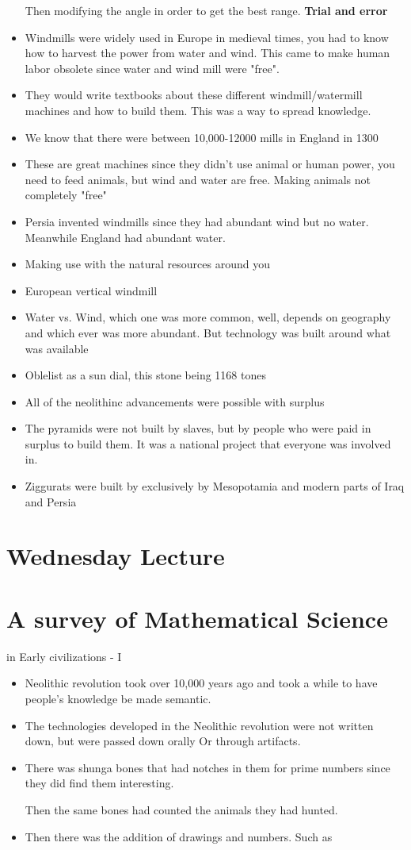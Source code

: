 \documentclass{article}
\begin{document}
\begin{itemize}
  Then modifying the angle in order to get the best range. \textbf{Trial and error}
\item Windmills were widely used in Europe in medieval times,
  you had to know how to harvest the power from water and wind. This came to
  make human labor obsolete since water and wind mill were "free".
\item They would write textbooks about these different windmill/watermill machines
  and how to build them. This was a way to spread knowledge.
\item We know that there were between 10,000-12000 mills in England in 1300
\item These are great machines since they didn't use animal or human power,
  you need to feed animals, but wind and water are free. Making animals not completely "free"
\item Persia invented windmills since they had abundant wind but no water.
  Meanwhile England had abundant water.
\item Making use with the natural resources around you
\item European vertical windmill
\item Water vs. Wind, which one was more common, well, depends on geography and which
  ever was more abundant. But technology was built around what was available
\item Oblelist as a sun dial, this stone being 1168 tones
\item All of the neolithinc advancements were possible with surplus
\item The pyramids were not built by slaves, but by people who were paid in surplus
  to build them. It was a national project that everyone was involved in.
\item Ziggurats were built by exclusively by Mesopotamia and modern parts of Iraq and Persia
\end{itemize}

\newpage
\section*{Wednesday Lecture}

\section{A survey of Mathematical Science}
in Early civilizations - I

\begin{itemize}
  \item Neolithic revolution took over 10,000 years ago
    and took a while to have people's knowledge be made semantic.
  \item The technologies developed in the Neolithic
    revolution were not written down, but were passed down orally
    Or through artifacts.
  \item There was shunga bones that had notches in them
    for prime numbers since they did find them interesting.

    Then the same bones had counted the animals they had hunted.
  \item Then there was the addition of drawings and numbers. Such as
\end{itemize}
\end{document}
